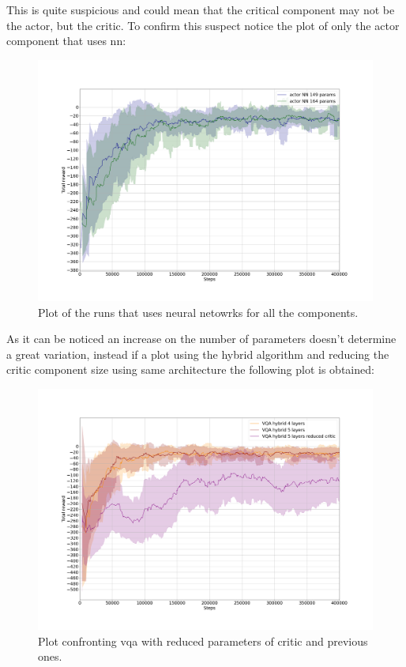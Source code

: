 This is quite suspicious and could mean that the critical component may not be the actor, but the critic. To confirm this suspect notice the plot of only the actor component that uses \acrlong{nn}:
\begin{figure}[H]
	\centering
	\includegraphics[width=\linewidth]{"img/classics actor"}
	\caption{Plot of the runs that uses neural netowrks for all the components.}
	\label{fig:classics-actor}
\end{figure}
As it can be noticed an increase on the number of parameters doesn't determine a great variation, instead if a plot using the hybrid algorithm and reducing the critic component size using same architecture the following plot is obtained:
\begin{figure}[H]
	\centering
	\includegraphics[width=\linewidth]{"img/VQA critic reduced"}
	\caption{Plot confronting vqa with reduced parameters of critic and previous ones.}
	\label{fig:vqa-critic-reduced}
\end{figure}

